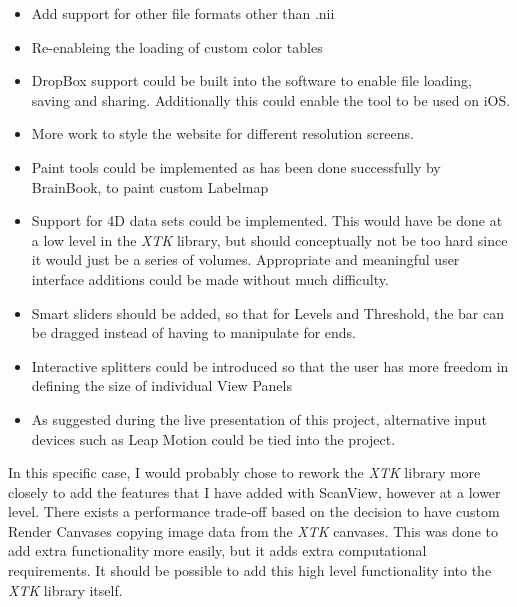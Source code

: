 \documentclass[a4paper,11pt,twoside]{article}
\begin{document}
\begin{itemize}
\item Add support for other file formats other than .nii
\item Re-enableing the loading of custom color tables
\item DropBox support could be built into the software to enable file loading, saving and sharing. Additionally this could enable the tool to be used on iOS.
\item More work to style the website for different resolution screens.
\item Paint tools could be implemented as has been done successfully by BrainBook, to paint custom Labelmap
\item Support for 4D data sets could be implemented. This would have be done at a low level in the \textit{XTK} library, but should conceptually not be too hard since it would just be a series of volumes. Appropriate and meaningful user interface additions could be made without much difficulty.
\item Smart sliders should be added, so that for Levels and Threshold, the bar can be dragged instead of having to manipulate for ends.
\item Interactive splitters could be introduced so that the user has more freedom in defining the size of individual View Panels
\item As suggested during the live presentation of this project, alternative input devices such as Leap Motion could be tied into the project.
\end{itemize}


In this specific case, I would probably chose to rework the \textit{XTK} library more closely to add the features that I have added with ScanView, however at a lower level. There exists a performance trade-off based on the decision to have custom Render Canvases copying image data from the \textit{XTK} canvases. This was done to add extra functionality more easily, but it adds extra computational requirements. It should be possible to add this high level functionality into the \textit{XTK} library itself.










\newpage
\end{document}
